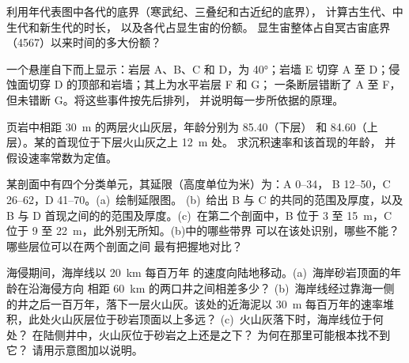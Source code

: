 \begin{exercise}[$\star$]\label{exo:b1:stratigraphic-scale:2}
利用年代表图中各代的底界（寒武纪、三叠纪和古近纪的底界），
计算古生代、中生代和新生代的时长，
以及各代占显生宙的份额。
显生宙整体占自冥古宙底界
（\qty{4567}{\Ma}）以来时间的多大份额？
\end{exercise}

\begin{exercise}[$\star$]\label{exo:b1:stratigraphic-scale:3}
一个悬崖自下而上显示：岩层 A、B、C 和 D，为 \ang{40}；岩墙
E 切穿 A 至 D；侵蚀面切穿 D 的顶部和岩墙；其上为水平岩层 F 和 G；
一条断层错断了 A 至 F，但未错断 G。将这些事件按先后排列，
并说明每一步所依据的原理。
\end{exercise}

\begin{exercise}[$\star$]\label{exo:b1:stratigraphic-scale:4}
页岩中相距 \qty{30}{m} 的两层火山灰层，年龄分别为 \qty{85.40}{\Ma}（下层）
和 \qty{84.60}{\Ma}（上层）。某的首现位于下层火山灰之上 \qty{12}{m} 处。
求沉积速率和该首现的年龄，
并假设速率常数为定值。
\end{exercise}

\begin{exercise}[$\star\star$]\label{exo:b1:stratigraphic-scale:5}
某剖面中有四个分类单元，其延限（高度单位为米）为：A 0--34，
B 12--50，C 26--62，D 41--70。(a)~绘制延限图。
(b)~给出 B 与 C 的共同的范围及厚度，以及 B 与 D
首现之间的的范围及厚度。(c)~在第二个剖面中，B 位于
3 至 15~m，C 位于 9 至 22~m，此外别无所知。(b)中的哪些带界
可以在该处识别，哪些不能？哪些层位可以在两个剖面之间
最有把握地对比？
\end{exercise}

\begin{exercise}[$\star\star$]\label{exo:b1:stratigraphic-scale:6}
海侵期间，海岸线以 \qty{20}{km} 每百万年
的速度向陆地移动。(a)~海岸砂岩顶面的年龄在沿海侵方向
相距 \qty{60}{km} 的两口井之间相差多少？
(b)~海岸线经过靠海一侧的井之后一百万年，落下一层火山灰。该处的近海泥以
\qty{30}{m} 每百万年的速率堆积，此处火山灰层位于砂岩顶面以上多远？
(c)~火山灰落下时，海岸线位于何处？
在陆侧井中，火山灰位于砂岩之上还是之下？
为何在那里可能根本找不到它？
请用示意图加以说明。
\end{exercise}

